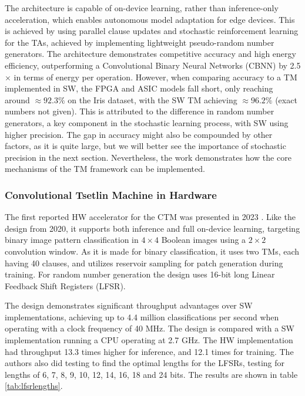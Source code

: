 The architecture is capable of on-device learning, rather than inference-only acceleration, which enables autonomous model adaptation for edge devices. This is achieved by using parallel clause updates and stochastic reinforcement learning for the TAs, achieved by implementing lightweight pseudo-random number generators. The architecture demonstrates competitive accuracy and high energy efficiency, outperforming a Convolutional Binary Neural Networks (CBNN) by 2.5 $\times$ in terms of energy per operation. However, when comparing accuracy to a TM implemented in SW, the FPGA and ASIC models fall short, only reaching around $\approx92.3\%$ on the Iris dataset, with the SW TM achieving $\approx96.2\%$ (exact numbers not given). This is attributed to the difference in random number generators, a key component in the stochastic learning process, with SW using higher precision. The gap in accuracy might also be compounded by other factors, as it is quite large, but we will better see the importance of stochastic precision in the next section. Nevertheless, the work demonstrates how the core mechanisms of the TM framework can be implemented.

\subsubsection{Convolutional Tsetlin Machine in Hardware}

The first reported HW accelerator for the CTM was presented in 2023 \cite{TunheimSveinAnders2023CTMT}. Like the design from 2020, it supports both inference and full on-device learning, targeting binary image pattern classification in $4 \times 4$ Boolean images using a $2 \times 2$ convolution window. As it is made for binary classification, it uses two TMs, each having 40 clauses, and utilizes reservoir sampling for patch generation during training. For random number generation the design uses 16-bit long Linear Feedback Shift Registers (LFSR). 

The design demonstrates significant throughput advantages over SW implementations, achieving up to 4.4 million classifications per second when operating with a clock frequency of 40 MHz. The design is compared with a SW implementation running a CPU operating at 2.7 GHz. The HW implementation had throughput 13.3 times higher for inference, and 12.1 times for training. The authors also did testing to find the optimal lengths for the LFSRs, testing for lengths of 6, 7, 8, 9, 10, 12, 14, 16, 18 and 24 bits. The results are shown in table \ref{tab:lfsrlengths}.


